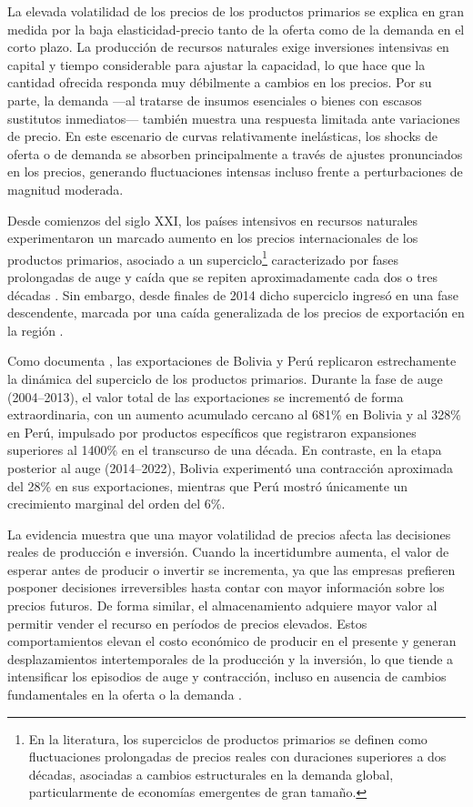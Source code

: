 \documentclass[../../TFM.tex]{subfiles}
\begin{document}
	La elevada volatilidad de los precios de los productos primarios se explica en gran medida por la baja elasticidad-precio tanto de la oferta como de la demanda en el corto plazo. La producción de recursos naturales exige inversiones intensivas en capital y tiempo considerable para ajustar la capacidad, lo que hace que la cantidad ofrecida responda muy débilmente a cambios en los precios. Por su parte, la demanda —al tratarse de insumos esenciales o bienes con escasos sustitutos inmediatos— también muestra una respuesta limitada ante variaciones de precio. En este escenario de curvas relativamente inelásticas, los shocks de oferta o de demanda se absorben principalmente a través de ajustes pronunciados en los precios, generando fluctuaciones intensas incluso frente a perturbaciones de magnitud moderada.
	
	Desde comienzos del siglo XXI, los países intensivos en recursos naturales experimentaron un marcado aumento en los precios internacionales de los productos primarios, asociado a un superciclo\footnote{En la literatura, los superciclos de productos primarios se definen como fluctuaciones prolongadas de precios reales con duraciones superiores a dos décadas, asociadas a cambios estructurales en la demanda global, particularmente de economías emergentes de gran tamaño.} caracterizado por fases prolongadas de auge y caída que se repiten aproximadamente cada dos o tres décadas \parencite{Fernndez2020}. Sin embargo, desde finales de 2014 dicho superciclo ingresó en una fase descendente, marcada por una caída generalizada de los precios de exportación en la región \parencite{Agramont-Lechn2024}.
	
	Como documenta \textcite{Agramont-Lechn2024}, las exportaciones de Bolivia y Perú replicaron estrechamente la dinámica del superciclo de los productos primarios. Durante la fase de auge (2004--2013), el valor total de las exportaciones se incrementó de forma extraordinaria, con un aumento acumulado cercano al 681\% en Bolivia y al 328\% en Perú, impulsado por productos específicos que registraron expansiones superiores al 1400\% en el transcurso de una década. En contraste, en la etapa posterior al auge (2014--2022), Bolivia experimentó una contracción aproximada del 28\% en sus exportaciones, mientras que Perú mostró únicamente un crecimiento marginal del orden del 6\%.
	
	La evidencia muestra que una mayor volatilidad de precios afecta las decisiones reales de producción e inversión. Cuando la incertidumbre aumenta, el valor de esperar antes de producir o invertir se incrementa, ya que las empresas prefieren posponer decisiones irreversibles hasta contar con mayor información sobre los precios futuros. De forma similar, el almacenamiento adquiere mayor valor al permitir vender el recurso en períodos de precios elevados. Estos comportamientos elevan el costo económico de producir en el presente y generan desplazamientos intertemporales de la producción y la inversión, lo que tiende a intensificar los episodios de auge y contracción, incluso en ausencia de cambios fundamentales en la oferta o la demanda \parencite{Pindyck2004}.
	
\end{document}
